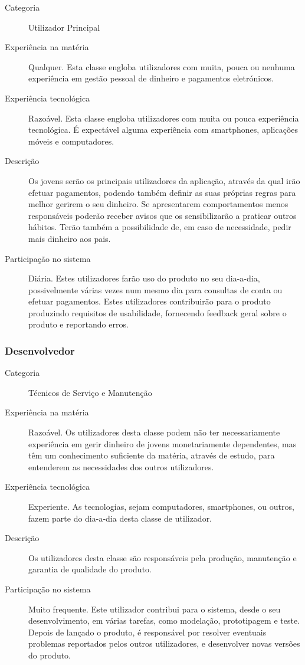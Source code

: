 \documentclass{article}
\begin{document}
      \begin{description}
        \item[Categoria] Utilizador Principal
        \item[Experiência na matéria] Qualquer. Esta classe engloba utilizadores com muita, pouca ou nenhuma experiência em gestão pessoal de dinheiro e pagamentos eletrónicos.
        \item[Experiência tecnológica] Razoável. Esta classe engloba utilizadores com muita ou pouca experiência tecnológica. É expectável alguma experiência com smartphones, aplicações móveis e computadores.
        \item[Descrição] Os jovens serão os principais utilizadores da aplicação, através da qual irão efetuar pagamentos, podendo também definir as suas próprias regras para melhor gerirem o seu dinheiro. Se apresentarem comportamentos menos responsáveis poderão receber avisos que os sensibilizarão a praticar outros hábitos. Terão também a possibilidade de, em caso de necessidade, pedir mais dinheiro aos pais.
        \item[Participação no sistema] Diária. Estes utilizadores farão uso do produto no seu dia-a-dia, possivelmente várias vezes num mesmo dia para consultas de conta ou efetuar pagamentos. Estes utilizadores contribuirão para o produto produzindo requisitos de usabilidade, fornecendo feedback geral sobre o produto e reportando erros.
      \end{description}

    \subsubsection{Desenvolvedor}

      \begin{description}
        \item[Categoria] Técnicos de Serviço e Manutenção
        \item[Experiência na matéria] Razoável. Os utilizadores desta classe podem não ter necessariamente experiência em gerir dinheiro de jovens monetariamente dependentes, mas têm um conhecimento suficiente da matéria, através de estudo, para entenderem as necessidades dos outros utilizadores.
        \item[Experiência tecnológica] Experiente. As tecnologias, sejam computadores, smartphones, ou outros, fazem parte do dia-a-dia desta classe de utilizador.
        \item[Descrição] Os utilizadores desta classe são responsáveis pela produção, manutenção e garantia de qualidade do produto.
        \item[Participação no sistema] Muito frequente. Este utilizador contribui para o sistema, desde o seu desenvolvimento, em várias tarefas, como modelação, prototipagem e teste. Depois de lançado o produto, é responsável por resolver eventuais problemas reportados pelos outros utilizadores, e desenvolver novas versões do produto.
      \end{description}
\end{document}
